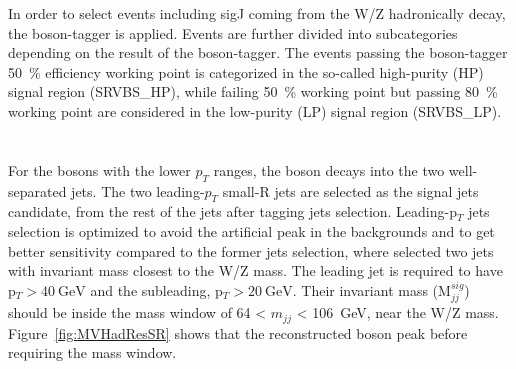 In order to select events including sigJ coming from the W/Z hadronically decay, the boson-tagger is applied. Events are further divided into subcategories depending on the result of the boson-tagger. The events passing the boson-tagger 50~\% efficiency working point is categorized in the so-called high-purity (HP) signal region (SRVBS\_HP), while failing 50~\% working point but passing 80~\% working point are considered in the low-purity (LP) signal region (SRVBS\_LP). \\ \\ 

\noindent\textbf{}  \\
For the bosons with the lower $p_T$ ranges, the boson decays into the two well-separated jets. The two leading-$p_T$ small-R jets are selected as the signal jets candidate, from the rest of the jets after tagging jets selection. Leading-p$_T$ jets selection is optimized to avoid the artificial peak in the backgrounds and to get better sensitivity compared to the former jets selection, where selected two jets with invariant mass closest to the W/Z mass. 
The leading jet is required to have p$_T > 40~\mathrm{GeV}$ and the subleading, p$_T > 20~\mathrm{GeV}$. Their invariant mass (M$^{sig}_{jj}$) should be inside the mass window of 64 < $m_{jj}$ < 106~GeV, near the W/Z mass. Figure~\ref{fig:MVHadResSR} shows that the reconstructed boson peak before requiring the mass window.


